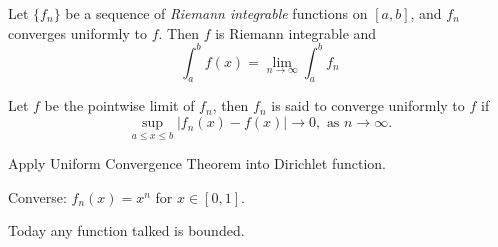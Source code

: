 \begin{theorem}
Let $\{f_n\}$ be a sequence of \emph{Riemann integrable} functions on $[a,b]$, and $f_n$ converges uniformly to $f$. Then $f$ is Riemann integrable and 
\[
\int_a^bf(x)=\lim_{n\to\infty}\int_a^bf_n
\]
\end{theorem}

\begin{definition}
Let $f$ be the pointwise limit of $f_n$, then $f_n$ is said to converge uniformly to $f$ if 
\[
\sup_{a\le x\le b}|f_n(x) - f(x)|\to0,\mbox{ as }n\to\infty.
\]
\end{definition}

Apply Uniform Convergence Theorem into Dirichlet function.

Converse: $f_n(x) = x^n$ for $x\in[0,1]$.

Today any function talked is bounded.














